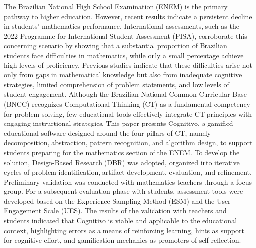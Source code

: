 The Brazilian National High School Examination (ENEM) is the primary pathway to
higher education. However, recent results indicate a persistent
decline in students' mathematics performance. International assessments, such as
the 2022 Programme for International Student Assessment (PISA), corroborate this
concerning scenario by showing that a substantial proportion of Brazilian
students face difficulties in mathematics, while only a small percentage achieve
high levels of proficiency. Previous studies indicate that these difficulties
arise not only from gaps in mathematical knowledge but also from inadequate
cognitive strategies, limited comprehension of problem statements, and low
levels of student engagement. Although the Brazilian National Common Curricular
Base (BNCC) recognizes Computational Thinking (CT) as a fundamental competency
for problem-solving, few educational tools effectively integrate CT principles
with engaging instructional strategies. This paper presents Cognitivo, a
gamified educational software designed around the four pillars of CT, namely decomposition, abstraction, pattern recognition, and algorithm
design, to support students preparing for the mathematics section of the ENEM.
To develop the solution, Design-Based Research (DBR) was adopted, organized into
iterative cycles of problem identification, artifact development, evaluation,
and refinement. Preliminary validation was conducted with mathematics teachers through a focus group. For a subsequent evaluation phase with students, assessment tools were developed based on the Experience Sampling Method (ESM) and the User Engagement Scale (UES). The results of the validation with teachers and students indicated that Cognitivo is viable and applicable to the educational context, highlighting errors as a means of reinforcing learning, hints as support for cognitive effort, and gamification mechanics as promoters of self-reflection.


